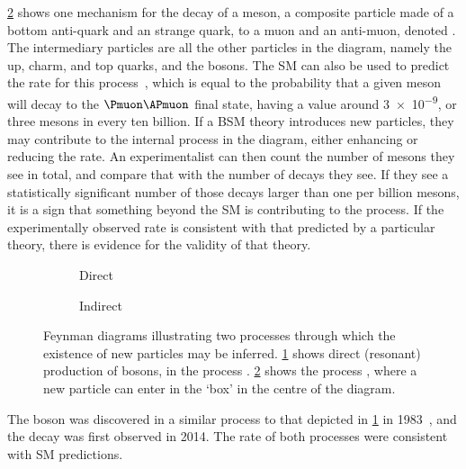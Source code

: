 \cref{fig:intro:sm:particle_production:indirect} shows one mechanism for the 
decay of a \PBs meson, a composite particle made of a bottom anti-quark and an 
strange quark, to a muon and an anti-muon, denoted \decay{\PBs}{\Pmuon\APmuon}.
The intermediary particles are all the other particles in the diagram, namely 
the up, charm, and top quarks, and the \PW bosons.
The \ac{SM} can also be used to predict the rate for this 
process~\cite{Bobeth:2013uxa}, which is equal to the probability that a given 
\PBs meson will decay to the $\Pmuon\APmuon$ final state, having a value around 
\num{3e-9}, or three \PBs mesons in every ten billion.
If a \ac{BSM} theory introduces new particles, they may contribute to the 
internal process in the diagram, either enhancing or reducing the rate.
An experimentalist can then count the number of \PBs mesons they see in total, 
and compare that with the number of \decay{\PBs}{\Pmuon\APmuon} decays they 
see.
If they see a statistically significant number of those decays larger than one 
per billion \PBs mesons, it is a sign that something beyond the \ac{SM} is 
contributing to the process.
If the experimentally observed rate is consistent with that predicted by a 
particular theory, there is evidence for the validity of that theory.

\begin{figure}
  \begin{subfigure}[b]{0.4\textwidth}
    \centering
    
    \caption{Direct}
    \label{fig:intro:sm:particle_production:direct}
  \end{subfigure}
  \begin{subfigure}[b]{0.6\textwidth}
    \centering
    
    \caption{Indirect}
    \label{fig:intro:sm:particle_production:indirect}
  \end{subfigure}
  \caption{%
    Feynman diagrams illustrating two processes through which the existence of 
    new particles may be inferred.
    \cref{fig:intro:sm:particle_production:direct} shows direct (resonant) 
    production of \PZ bosons, in the process 
    \decay{\Pelectron\APelectron}{\Pmuon\APmuon}.
    \cref{fig:intro:sm:particle_production:indirect} shows the process 
    \decay{\PBs}{\Pmuon\APmuon}, where a new particle can enter in the `box' in 
    the centre of the diagram.
  }
  \label{fig:intro:sm:particle_production}
\end{figure}

The \PZ boson was discovered in a similar process to that depicted in 
\cref{fig:intro:sm:particle_production:direct} in 
1983~\cite{1983398,BAGNAIA1983130}, and the decay \decay{\PBs}{\Pmuon\APmuon} 
was first observed in 2014.
The rate of both processes were consistent with \ac{SM} predictions.

